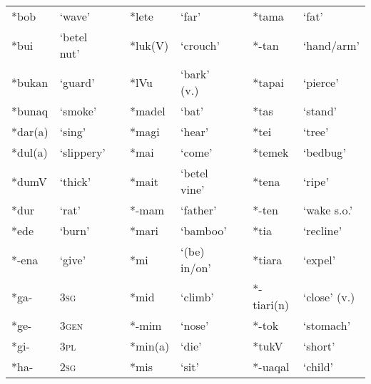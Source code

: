\begin{center}
\begin{supertabular}{m{0.70045984in}m{1.0330598in}m{0.11705985in}m{0.7490598in}m{1.2150599in}m{0.12545985in}m{0.77335984in}m{0.81365985in}}
*bob &
{\textquoteleft}wave{\textquoteright} &
 &
*lete &
{\textquoteleft}far{\textquoteright} &
 &
*tama &
{\textquoteleft}fat{\textquoteright} \\
*bui &
{\textquoteleft}betel nut{\textquoteright} &
 &
*luk(V) &
{\textquoteleft}crouch{\textquoteright} &
 &
*-tan &
{\textquoteleft}hand/arm{\textquoteright}\\
*bukan &
{\textquoteleft}guard{\textquoteright} &
 &
*lVu &
{\textquoteleft}bark{\textquoteright} (v.) &
 &
*tapai &
{\textquoteleft}pierce{\textquoteright}\\
*bunaq &
{\textquoteleft}smoke{\textquoteright} &
 &
*madel &
{\textquoteleft}bat{\textquoteright} &
 &
*tas &
{\textquoteleft}stand{\textquoteright}\\
*dar(a) &
{\textquoteleft}sing{\textquoteright} &
 &
*magi &
{\textquoteleft}hear{\textquoteright} &
 &
*tei &
{\textquoteleft}tree{\textquoteright}\\
*dul(a) &
{\textquoteleft}slippery{\textquoteright} &
 &
*mai &
{\textquoteleft}come{\textquoteright} &
 &
*temek &
{\textquoteleft}bedbug{\textquoteright}\\
*dumV &
{\textquoteleft}thick{\textquoteright} &
 &
*mait &
{\textquoteleft}betel vine{\textquoteright} &
 &
*tena &
{\textquoteleft}ripe{\textquoteright}\\
*dur &
{\textquoteleft}rat{\textquoteright} &
 &
*-mam &
{\textquoteleft}father{\textquoteright} &
 &
*-ten &
{\textquoteleft}wake s.o.{\textquoteright}\\
*ede &
{\textquoteleft}burn{\textquoteright} &
 &
*mari &
{\textquoteleft}bamboo{\textquoteright} &
 &
*tia &
{\textquoteleft}recline{\textquoteright}\\
*-ena &
{\textquoteleft}give{\textquoteright} &
 &
*mi &
{\textquoteleft}(be) in/on{\textquoteright} &
 &
*tiara &
{\textquoteleft}expel{\textquoteright}\\
*ga- &
\textsc{3}\textsc{sg} &
 &
*mid &
{\textquoteleft}climb{\textquoteright} &
 &
*-tiari(n) &
{\textquoteleft}close{\textquoteright} (v.)\\
*ge- &
\textsc{3}\textsc{gen} &
 &
*-mim &
{\textquoteleft}nose{\textquoteright} &
 &
*-tok &
{\textquoteleft}stomach{\textquoteright}\\
*gi- &
\textsc{3}\textsc{pl} &
 &
*min(a) &
{\textquoteleft}die{\textquoteright} &
 &
*tukV &
{\textquoteleft}short{\textquoteright}\\
*ha- &
\textsc{2}\textsc{sg} &
 &
*mis &
{\textquoteleft}sit{\textquoteright} &
 &
*-uaqal &
{\textquoteleft}child{\textquoteright}\\

\end{supertabular}
\end{center}
